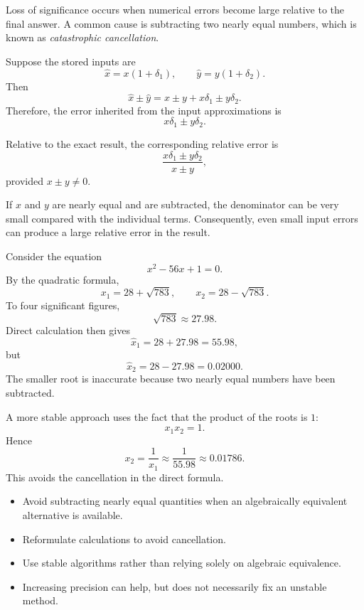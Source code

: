 \begin{definition}
  Loss of significance occurs when numerical errors become large relative to the final answer. A common cause is subtracting two nearly equal numbers, which is known as \emph{catastrophic cancellation}.
\end{definition}

Suppose the stored inputs are
\[
  \hat{x}=x(1+\delta_1),
  \qquad
  \hat{y}=y(1+\delta_2).
\]
Then
\[
  \hat{x}\pm\hat{y}
  =x\pm y+x\delta_1\pm y\delta_2.
\]
Therefore, the error inherited from the input approximations is
\[
  x\delta_1\pm y\delta_2.
\]

Relative to the exact result, the corresponding relative error is
\[
  \boxed{
    \frac{x\delta_1\pm y\delta_2}{x\pm y},
  }
\]
provided \(x\pm y\neq0\).

If \(x\) and \(y\) are nearly equal and are subtracted, the denominator can be very small compared with the individual terms. Consequently, even small input errors can produce a large relative error in the result.

\begin{example}
  Consider the equation
  \[
    x^2-56x+1=0.
  \]
  By the quadratic formula,
  \[
    x_1=28+\sqrt{783},
    \qquad
    x_2=28-\sqrt{783}.
  \]
  To four significant figures,
  \[
    \sqrt{783}\approx27.98.
  \]
  Direct calculation then gives
  \[
    \hat{x}_1=28+27.98=55.98,
  \]
  but
  \[
    \hat{x}_2=28-27.98=0.02000.
  \]
  The smaller root is inaccurate because two nearly equal numbers have been subtracted.

  A more stable approach uses the fact that the product of the roots is \(1\):
  \[
    x_1x_2=1.
  \]
  Hence
  \[
    x_2=\frac{1}{x_1}
    \approx\frac{1}{55.98}
    \approx0.01786.
  \]
  This avoids the cancellation in the direct formula.
\end{example}

\begin{remark}
  \begin{itemize} \emph{}
    \item Avoid subtracting nearly equal quantities when an algebraically equivalent alternative is available.
    \item Reformulate calculations to avoid cancellation.
    \item Use stable algorithms rather than relying solely on algebraic equivalence.
    \item Increasing precision can help, but does not necessarily fix an unstable method.
  \end{itemize}
\end{remark}

